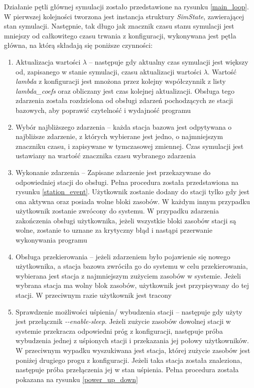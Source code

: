 \noindent Działanie pętli głównej symulacji zostało przedstawione na rysunku \ref{main_loop}. W pierwszej kolejności tworzona jest instancja struktury \emph{SimState}, zawierającej stan symulacji. Następnie, tak długo jak znacznik czasu stanu symulacji jest mniejszy od całkowitego czasu trwania z konfiguracji, wykonywana jest pętla główna, na którą składają się poniższe czynności:
\begin{enumerate}
\item Aktualizacja wartości $\lambda$ -- następuje gdy aktualny czas symulacji jest większy od, zapisanego w stanie symulacji, czasu aktualizacji wartości $\lambda$. Wartość \emph{lambda} z konfiguracji jest mnożona przez kolejny współczynnik z listy \emph{lambda\_coefs} oraz obliczany jest czas kolejnej aktualizacji. Obsługa tego zdarzenia została rozdzielona od obsługi zdarzeń pochodzących ze stacji bazowych, aby poprawić czytelność i wydajność programu
\item Wybór najbliższego zdarzenia -- każda stacja bazowa jest odpytywana o najbliższe zdarzenie, z których wybierane jest jedno, o najmniejszym znaczniku czasu, i zapisywane w tymczasowej zmiennej. Czas symulacji jest ustawiany na wartość znacznika czasu wybranego zdarzenia
\item Wykonanie zdarzenia -- Zapisane zdarzenie jest przekazywane do odpowiedniej stacji do obsługi. Pełna procedura została przedstawiona na rysunku \ref{station_event}. Użytkownik zostanie dodany do stacji tylko gdy jest ona aktywna oraz posiada wolne bloki zasobów. W każdym innym przypadku użytkownik zostanie zwrócony do systemu. W przypadku zdarzenia zakończenia obsługi użytkownika, jeżeli wszystkie bloki zasobów stacji są wolne, zostanie to uznane za krytyczny błąd i nastąpi przerwanie wykonywania programu
\item Obsługa przekierowania -- jeżeli zdarzeniem było pojawienie się nowego użytkownika, a stacja bazowa zwróciła go do systemu w celu przekierowania, wybierana jest stacja z najmniejszym zużyciem zasobów w systemie. Jeżeli wybrana stacja ma wolny blok zasobów, użytkownik jest przypisywany do tej stacji. W przeciwnym razie użytkownik jest tracony
\item Sprawdzenie możliwości uśpienia/ wybudzenia stacji -- następuje gdy użyty jest przełącznik \emph{-{}-enable-sleep}. Jeżeli zużycie zasobów dowolnej stacji w systemie przekracza odpowiedni próg z konfiguracji, następuje próba wybudzenia jednej z uśpionych stacji i przekazania jej połowy użytkowników. W przeciwnym wypadku wyszukiwana jest stacja, której zużycie zasobów jest poniżej drugiego progu z konfiguracji. Jeżeli taka stacja została znaleziona, następuje próba przełączenia jej w stan uśpienia. Pełna procedura została pokazana na rysunku \ref{power_up_down}
\end{enumerate}

